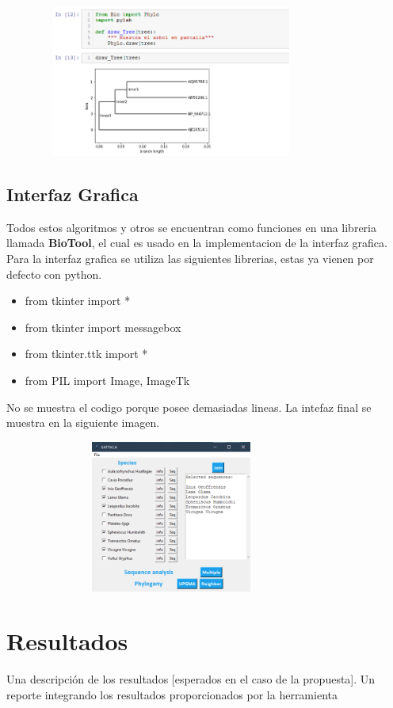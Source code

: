 \documentclass[a4paper]{article}
\begin{document}
\noindent 
\begin{center}
	\includegraphics[width=11cm,height=5cm]{mostrarArbol.png}
\end{center}

\subsection{Interfaz Grafica}
\noindent Todos estos algoritmos y otros se encuentran como funciones en una libreria llamada \textbf{BioTool}, el cual es usado en la implementacion de la interfaz grafica.
Para la interfaz grafica se utiliza las siguientes librerias, estas ya vienen por defecto con python.
\begin{itemize}

\item from tkinter import *
\item from tkinter import messagebox
\item from tkinter.ttk import *
\item from PIL import Image, ImageTk

\end{itemize}
No se muestra el codigo porque posee demasiadas lineas. La intefaz final se muestra en la siguiente imagen.
\begin{center}
	\includegraphics[width=11cm,height=5cm]{InterfazFinal.png}
\end{center}



\section{Resultados}
Una descripción de los resultados [esperados en el caso de la propuesta]. Un reporte integrando los resultados proporcionados por la herramienta
\end{document}
